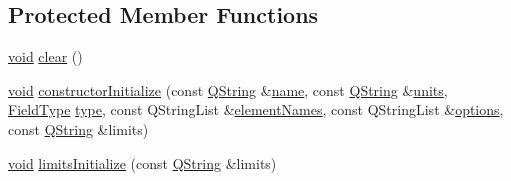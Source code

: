 \subsection*{Protected Member Functions}
\begin{DoxyCompactItemize}
\item 
\hyperlink{group___u_a_v_objects_plugin_ga444cf2ff3f0ecbe028adce838d373f5c}{void} \hyperlink{group___u_a_v_objects_plugin_ga3d25ad42d17576d9c6218bd1c65345a9}{clear} ()
\item 
\hyperlink{group___u_a_v_objects_plugin_ga444cf2ff3f0ecbe028adce838d373f5c}{void} \hyperlink{group___u_a_v_objects_plugin_ga8c808af230791ca079eca575c6c6c1ae}{constructor\-Initialize} (const \hyperlink{group___u_a_v_objects_plugin_gab9d252f49c333c94a72f97ce3105a32d}{Q\-String} \&\hyperlink{glext_8h_ad977737dfc9a274a62741b9500c49a32}{name}, const \hyperlink{group___u_a_v_objects_plugin_gab9d252f49c333c94a72f97ce3105a32d}{Q\-String} \&\hyperlink{group___u_a_v_objects_plugin_ga1ecf5fdaab2ac408b67623d5d75368c5}{units}, \hyperlink{group___u_a_v_objects_plugin_ga74498368bc91f3ed74beacb096744cf3}{Field\-Type} \hyperlink{glext_8h_a7d05960f4f1c1b11f3177dc963a45d86}{type}, const Q\-String\-List \&\hyperlink{group___u_a_v_objects_plugin_ga5849334da3325c4cac8625bb5910d57d}{element\-Names}, const Q\-String\-List \&\hyperlink{group___u_a_v_objects_plugin_ga97fe1c3ed2d74eb06ea7e24abf4ce09c}{options}, const \hyperlink{group___u_a_v_objects_plugin_gab9d252f49c333c94a72f97ce3105a32d}{Q\-String} \&limits)
\item 
\hyperlink{group___u_a_v_objects_plugin_ga444cf2ff3f0ecbe028adce838d373f5c}{void} \hyperlink{group___u_a_v_objects_plugin_ga7ceda7a3dfdcca81d80ed887485c4b76}{limits\-Initialize} (const \hyperlink{group___u_a_v_objects_plugin_gab9d252f49c333c94a72f97ce3105a32d}{Q\-String} \&limits)
\end{DoxyCompactItemize}
